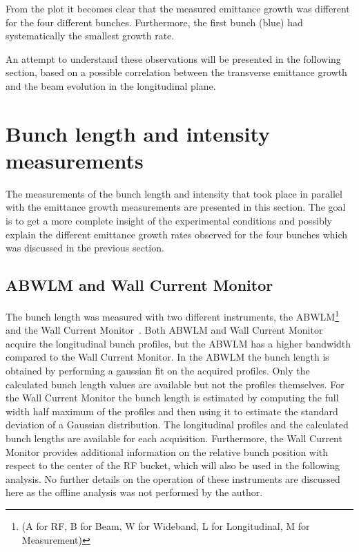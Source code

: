 From the plot it becomes clear that the measured emittance growth was different for the four different bunches. Furthermore, the first bunch (blue) had systematically the smallest growth rate.

An attempt to understand these observations will be presented in the following section, based on a possible correlation between the transverse emittance growth and the beam evolution in the longitudinal plane.

\section{Bunch length and intensity measurements}\label{sec:bunch_length_intensity_meas_2018}
The measurements of the bunch length and intensity that took place in parallel with the emittance growth measurements are presented in this section. The goal is to get a more complete insight of the experimental conditions and possibly explain the different emittance growth rates observed for the four bunches which was discussed in the previous section. %

\subsection{ABWLM and Wall Current Monitor}\label{sec:ABWLM_WallCurrentMonitor}
The bunch length was measured with two different instruments, the ABWLM\footnote{(A for RF, B for Beam, W for Wideband, L for Longitudinal, M for Measurement)}~\cite{ABWLM} and the Wall Current Monitor~\cite{Papotti:1124099}. Both ABWLM and Wall Current Monitor acquire the longitudinal bunch profiles, but the ABWLM has a higher bandwidth compared to the Wall Current Monitor. In the ABWLM the bunch length is obtained by performing a gaussian fit on the acquired profiles. Only the calculated bunch length values are available but not the profiles themselves. For the Wall Current Monitor the bunch length is estimated by computing the full width half maximum of the profiles and then using it to estimate the standard deviation of a Gaussian distribution. The longitudinal profiles and the calculated bunch lengths are available for each acquisition. Furthermore, the Wall Current Monitor provides additional information on the relative bunch position with respect to the center of the RF bucket, which will also be used in the following analysis. No further details on the operation of these instruments are discussed here as the offline analysis was not performed by the author. %

